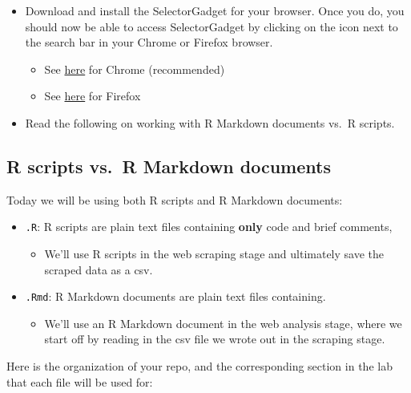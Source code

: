 \documentclass[
]{article}
\providecommand{\tightlist}{%
  \setlength{\itemsep}{0pt}\setlength{\parskip}{0pt}}
\begin{document}
\begin{itemize}
\item
  Download and install the SelectorGadget for your browser. Once you do,
  you should now be able to access SelectorGadget by clicking on the
  icon next to the search bar in your Chrome or Firefox browser.

  \begin{itemize}
  \tightlist
  \item
    See
    \href{https://chrome.google.com/webstore/detail/selectorgadget/mhjhnkcfbdhnjickkkdbjoemdmbfginb}{here}
    for Chrome (recommended)
  \item
    See
    \href{https://addons.mozilla.org/en-US/firefox/addon/chropath-for-firefox}{here}
    for Firefox
  \end{itemize}
\item
  Read the following on working with R Markdown documents vs.~R scripts.
\end{itemize}

\subsection{R scripts vs.~R Markdown
documents}\label{r-scripts-vs.-r-markdown-documents}

Today we will be using both R scripts and R Markdown documents:

\begin{itemize}
\item
  \texttt{.R}: R scripts are plain text files containing \textbf{only}
  code and brief comments,

  \begin{itemize}
  \tightlist
  \item
    We'll use R scripts in the web scraping stage and ultimately save
    the scraped data as a csv.
  \end{itemize}
\item
  \texttt{.Rmd}: R Markdown documents are plain text files containing.

  \begin{itemize}
  \tightlist
  \item
    We'll use an R Markdown document in the web analysis stage, where we
    start off by reading in the csv file we wrote out in the scraping
    stage.
  \end{itemize}
\end{itemize}

Here is the organization of your repo, and the corresponding section in
the lab that each file will be used for:
\end{document}

